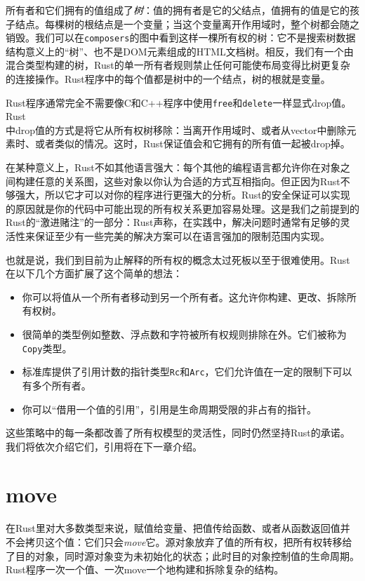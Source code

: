 所有者和它们拥有的值组成了\emph{树}：值的拥有者是它的父结点，值拥有的值是它的孩子结点。每棵树的根结点是一个变量；当这个变量离开作用域时，整个树都会随之销毁。我们可以在\texttt{composers}的图中看到这样一棵所有权的树：它不是搜索树数据结构意义上的“树”、也不是DOM元素组成的HTML文档树。相反，我们有一个由混合类型构建的树，Rust的单一所有者规则禁止任何可能使布局变得比树更复杂的连接操作。Rust程序中的每个值都是树中的一个结点，树的根就是变量。

Rust程序通常完全不需要像C和C++程序中使用\texttt{free}和\texttt{delete}一样显式drop值。Rust\\
中drop值的方式是将它从所有权树移除：当离开作用域时、或者从vector中删除元素时、或者类似的情况。这时，Rust保证值会和它拥有的所有值一起被drop掉。

在某种意义上，Rust不如其他语言强大：每个其他的编程语言都允许你在对象之间构建任意的关系图，这些对象以你认为合适的方式互相指向。但正因为Rust不够强大，所以它才可以对你的程序进行更强大的分析。Rust的安全保证可以实现的原因就是你的代码中可能出现的所有权关系更加容易处理。这是我们之前提到的Rust的“激进赌注”的一部分：Rust声称，在实践中，解决问题时通常有足够的灵活性来保证至少有一些完美的解决方案可以在语言强加的限制范围内实现。

也就是说，我们到目前为止解释的所有权的概念太过死板以至于很难使用。Rust在以下几个方面扩展了这个简单的想法：
\begin{itemize}
    \item 你可以将值从一个所有者移动到另一个所有者。这允许你构建、更改、拆除所有权树。
    \item 很简单的类型例如整数、浮点数和字符被所有权规则排除在外。它们被称为\texttt{Copy}类型。
    \item 标准库提供了引用计数的指针类型\texttt{Rc}和\texttt{Arc}，它们允许值在一定的限制下可以有多个所有者。
    \item 你可以“借用一个值的引用”，引用是生命周期受限的非占有的指针。
\end{itemize}

这些策略中的每一条都改善了所有权模型的灵活性，同时仍然坚持Rust的承诺。我们将依次介绍它们，引用将在下一章介绍。

\section{move}
在Rust里对大多数类型来说，赋值给变量、把值传给函数、或者从函数返回值并不会拷贝这个值：它们只会\emph{move}它。源对象放弃了值的所有权，把所有权转移给了目的对象，同时源对象变为未初始化的状态；此时目的对象控制值的生命周期。Rust程序一次一个值、一次move一个地构建和拆除复杂的结构。

